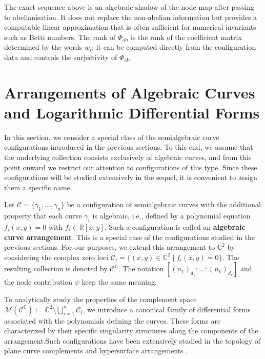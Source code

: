 \documentclass[article,11pt]{amsart} \numberwithin{equation}{section}
\numberwithin{equation}{section}
\begin{document}
{\begin{rk}
	The exact sequence above is an algebraic shadow of the node map after passing to abelianisation.  It does not replace the non‑abelian information but provides a computable linear approximation that is often sufficient for numerical invariants such as Betti numbers.  The rank of \(\Phi_{\mathrm{ab}}\) is the rank of the coefficient matrix determined by the words \(w_i\); it can be computed directly from the configuration data and controls the surjectivity of \(\Phi_{\mathrm{ab}}\).
\end{rk}

\section{Arrangements of Algebraic Curves and Logarithmic Differential Forms}\label{sec:arrangements}

In this section, we consider a special class of the semialgebraic curve configurations introduced in the previous sections.  To this end, we assume that the underlying collection consists exclusively of algebraic curves, and from this point onward we restrict our attention to configurations of this type.  Since these configurations will be studied extensively in the sequel, it is convenient to assign them a specific name.

\begin{df}\label{def:5.1}
	Let $\mathcal{C} = \{\gamma_1,\dots,\gamma_n\}$ be a configuration of semialgebraic curves with the additional property that each curve $\gamma_i$ is algebraic, i.e., defined by a polynomial equation $f_i(x,y)=0$ with $f_i\in\mathbb{R}[x,y]$.  Such a configuration is called an \textbf{algebraic curve arrangement}.  This is a special case of the configurations studied in the previous sections.  
	For our purposes, we extend this arrangement to $\mathbb{C}^2$ by considering the complex zero loci $\mathscr{C}_i = \{(x,y)\in\mathbb{C}^2 \mid f_i(x,y)=0\}$.  The resulting collection is denoted by $\mathcal{C}^\mathbb{C}$.  The notation $[(n_1)_{d_1}:\dots:(n_k)_{d_k}]$ and the node contribution $\psi$ keep the same meaning.
\end{df}

To analytically study the properties of the complement space $\mathcal{M}(\mathcal{C}^\mathbb{C}) := \mathbb{C}^2 \setminus \bigcup_{i=1}^n \mathscr{C}_i$, we introduce a canonical family of differential forms associated with the polynomials defining the curves. These forms are characterized by their specific singularity structures along the components of the arrangement.Such configurations have been extensively studied in the topology of plane curve complements and hypersurface arrangements
\cite{Randell83,Libgober2001,Dupont2015}.

}
\end{document}

